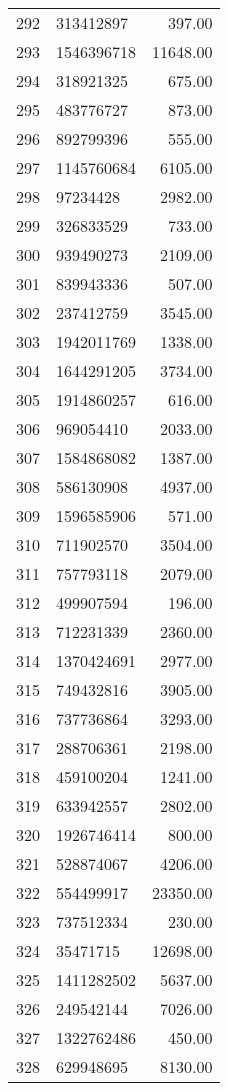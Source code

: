 \begin{table}[ht]
\begin{tabular}{rlr}
  292 & 313412897 & 397.00 \\ 
  293 & 1546396718 & 11648.00 \\ 
  294 & 318921325 & 675.00 \\ 
  295 & 483776727 & 873.00 \\ 
  296 & 892799396 & 555.00 \\ 
  297 & 1145760684 & 6105.00 \\ 
  298 & 97234428 & 2982.00 \\ 
  299 & 326833529 & 733.00 \\ 
  300 & 939490273 & 2109.00 \\ 
  301 & 839943336 & 507.00 \\ 
  302 & 237412759 & 3545.00 \\ 
  303 & 1942011769 & 1338.00 \\ 
  304 & 1644291205 & 3734.00 \\ 
  305 & 1914860257 & 616.00 \\ 
  306 & 969054410 & 2033.00 \\ 
  307 & 1584868082 & 1387.00 \\ 
  308 & 586130908 & 4937.00 \\ 
  309 & 1596585906 & 571.00 \\ 
  310 & 711902570 & 3504.00 \\ 
  311 & 757793118 & 2079.00 \\ 
  312 & 499907594 & 196.00 \\ 
  313 & 712231339 & 2360.00 \\ 
  314 & 1370424691 & 2977.00 \\ 
  315 & 749432816 & 3905.00 \\ 
  316 & 737736864 & 3293.00 \\ 
  317 & 288706361 & 2198.00 \\ 
  318 & 459100204 & 1241.00 \\ 
  319 & 633942557 & 2802.00 \\ 
  320 & 1926746414 & 800.00 \\ 
  321 & 528874067 & 4206.00 \\ 
  322 & 554499917 & 23350.00 \\ 
  323 & 737512334 & 230.00 \\ 
  324 & 35471715 & 12698.00 \\ 
  325 & 1411282502 & 5637.00 \\ 
  326 & 249542144 & 7026.00 \\ 
  327 & 1322762486 & 450.00 \\ 
  328 & 629948695 & 8130.00 \\ 

\end{tabular}
\end{table}
